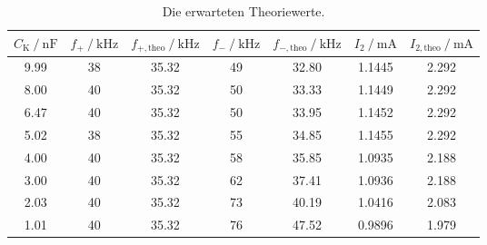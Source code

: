 \begin{table}[H]
  \centering
  \caption{Die erwarteten Theoriewerte.}
  \label{tab:theorietabelle}
  \begin{tabular}{c c c c c c c}
      \toprule
      $C_{\text{K}} \:/\: \si{\nano\farad}$ & $f_+ \:/\: \si{\kilo\hertz}$ & $f_{+, \text{theo}} \:/\: \si{\kilo\hertz}$ & $f_- \:/\: \si{\kilo\hertz}$ & $f_{-, \text{theo}} \:/\: \si{\kilo\hertz}$ & $I_2 \:/\: \si{\milli\ampere}$ & $I_{2,\text{theo}} \:/\: \si{\milli\ampere}$ \\
      \midrule
      9.99 & 38 & 35.32 & 49 & 32.80 & 1.1445 & 2.292 \\
      8.00 & 40 & 35.32 & 50 & 33.33 & 1.1449 & 2.292 \\
      6.47 & 40 & 35.32 & 50 & 33.95 & 1.1452 & 2.292 \\
      5.02 & 38 & 35.32 & 55 & 34.85 & 1.1455 & 2.292 \\
      4.00 & 40 & 35.32 & 58 & 35.85 & 1.0935 & 2.188 \\
      3.00 & 40 & 35.32 & 62 & 37.41 & 1.0936 & 2.188 \\
      2.03 & 40 & 35.32 & 73 & 40.19 & 1.0416 & 2.083 \\
      1.01 & 40 & 35.32 & 76 & 47.52 & 0.9896 & 1.979 \\
      \bottomrule
  \end{tabular}
\end{table}

\pagebreak